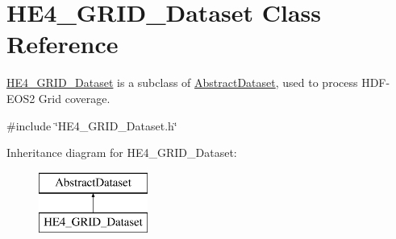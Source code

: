 \hypertarget{classHE4__GRID__Dataset}{
\section{HE4\_\-GRID\_\-Dataset Class Reference}
\label{classHE4__GRID__Dataset}
}


\hyperlink{classHE4__GRID__Dataset}{HE4\_\-GRID\_\-Dataset} is a subclass of \hyperlink{classAbstractDataset}{AbstractDataset}, used to process HDF-\/EOS2 Grid coverage.  




{\ttfamily \#include \char`\"{}HE4\_\-GRID\_\-Dataset.h\char`\"{}}

Inheritance diagram for HE4\_\-GRID\_\-Dataset:\begin{figure}[H]
\begin{center}
\leavevmode
\includegraphics[height=2.000000cm]{classHE4__GRID__Dataset}
\end{center}
\end{figure}
